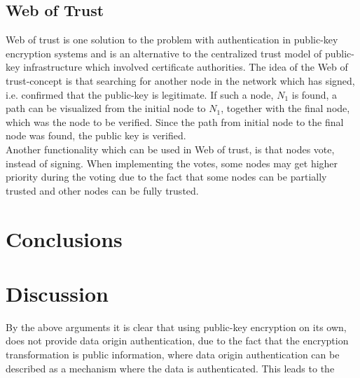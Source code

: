 \documentclass{acm_proc_article-sp}
\begin{document}
\subsection{Web of Trust} %
Web of trust is one solution to the problem with authentication in public-key encryption systems and is an alternative to the centralized trust model of public-key infrastructure which involved certificate authorities. The idea of the Web of trust-concept is that searching for another node in the network which has signed, i.e. confirmed that the public-key is legitimate. If such a node, $N_1$ is found, a path can be visualized from the initial node to $N_1$, together with the final node, which was the node to be verified. Since the path from initial node to the final node was found, the public key is verified. \\
Another functionality which can be used in Web of trust, is that nodes vote, instead of signing. When implementing the votes, some nodes may get higher priority during the voting due to the fact that some nodes can be partially trusted and other nodes can be fully trusted. \cite{rubin}



\section{Conclusions}

\section{Discussion}
By the above arguments it is clear that using public-key encryption on its own, does not provide data origin authentication, due to the fact that the encryption transformation is public information, where data origin authentication can be described as a mechanism where the data is authenticated. This leads to the 



%
%
\end{document}
